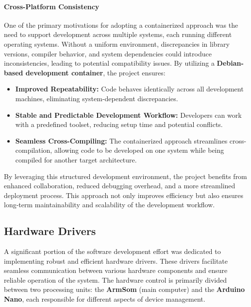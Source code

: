 \paragraph{Cross-Platform Consistency}  
One of the primary motivations for adopting a containerized approach was the need to support development across multiple systems, each running different operating systems. Without a uniform environment, discrepancies in library versions, compiler behavior, and system dependencies could introduce inconsistencies, leading to potential compatibility issues. By utilizing a \textbf{Debian-based development container}, the project ensures:  
\begin{itemize}  
	\item \textbf{Improved Repeatability:} Code behaves identically across all development machines, eliminating system-dependent discrepancies.  
	\item \textbf{Stable and Predictable Development Workflow:} Developers can work with a predefined toolset, reducing setup time and potential conflicts.  
	\item \textbf{Seamless Cross-Compiling:} The containerized approach streamlines cross-compilation, allowing code to be developed on one system while being compiled for another target architecture.  
\end{itemize}  

By leveraging this structured development environment, the project benefits from enhanced collaboration, reduced debugging overhead, and a more streamlined deployment process. This approach not only improves efficiency but also ensures long-term maintainability and scalability of the development workflow.  

\subsection{Hardware Drivers}
A significant portion of the software development effort was dedicated to implementing robust and efficient hardware drivers. These drivers facilitate seamless communication between various hardware components and ensure reliable operation of the system. The hardware control is primarily divided between two processing units: the \textbf{ArmSom} (main computer) and the \textbf{Arduino Nano}, each responsible for different aspects of device management.

